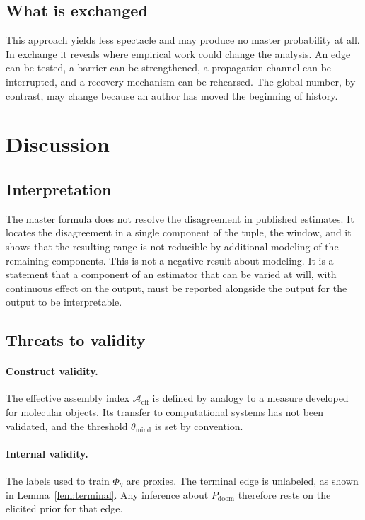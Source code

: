 \documentclass[11pt]{article}
\theoremstyle{remark}
\newcommand{\PD}{P_{\mathrm{doom}}}
\newcommand{\Aeff}{\mathcal{A}_{\mathrm{eff}}}
\begin{document}
\subsection{What is exchanged}

This approach yields less spectacle and may produce no master probability at all. In exchange it reveals where empirical work could change the analysis. An edge can be tested, a barrier can be strengthened, a propagation channel can be interrupted, and a recovery mechanism can be rehearsed. The global number, by contrast, may change because an author has moved the beginning of history.


\section{Discussion}\label{sec:discussion}

\subsection{Interpretation}

The master formula does not resolve the disagreement in published estimates. It locates the disagreement in a single component of the tuple, the window, and it shows that the resulting range is not reducible by additional modeling of the remaining components. This is not a negative result about modeling. It is a statement that a component of an estimator that can be varied at will, with continuous effect on the output, must be reported alongside the output for the output to be interpretable.

\subsection{Threats to validity}

\paragraph{Construct validity.} The effective assembly index $\Aeff$ is defined by analogy to a measure developed for molecular objects. Its transfer to computational systems has not been validated, and the threshold $\theta_{\mathrm{mind}}$ is set by convention.

\paragraph{Internal validity.} The labels used to train $\Phi_\theta$ are proxies. The terminal edge is unlabeled, as shown in Lemma~\ref{lem:terminal}. Any inference about $\PD$ therefore rests on the elicited prior for that edge.
\end{document}

